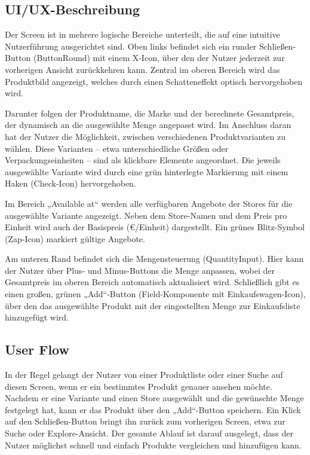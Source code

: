 \subsection{UI/UX-Beschreibung}
Der Screen ist in mehrere logische Bereiche unterteilt, die auf eine intuitive Nutzerführung ausgerichtet sind. Oben links befindet sich ein runder Schließen-Button (ButtonRound) mit einem X-Icon, über den der Nutzer jederzeit zur vorherigen Ansicht zurückkehren kann. Zentral im oberen Bereich wird das Produktbild angezeigt, welches durch einen Schatteneffekt optisch hervorgehoben wird.

Darunter folgen der Produktname, die Marke und der berechnete Gesamtpreis, der dynamisch an die ausgewählte Menge angepasst wird. Im Anschluss daran hat der Nutzer die Möglichkeit, zwischen verschiedenen Produktvarianten zu wählen. Diese Varianten – etwa unterschiedliche Größen oder Verpackungseinheiten – sind als klickbare Elemente angeordnet. Die jeweils ausgewählte Variante wird durch eine grün hinterlegte Markierung mit einem Haken (Check-Icon) hervorgehoben.

Im Bereich „Available at“ werden alle verfügbaren Angebote der Stores für die ausgewählte Variante angezeigt. Neben dem Store-Namen und dem Preis pro Einheit wird auch der Basispreis (€/Einheit) dargestellt. Ein grünes Blitz-Symbol (Zap-Icon) markiert gültige Angebote. 

Am unteren Rand befindet sich die Mengensteuerung (QuantityInput). Hier kann der Nutzer über Plus- und Minus-Buttons die Menge anpassen, wobei der Gesamtpreis im oberen Bereich automatisch aktualisiert wird. Schließlich gibt es einen großen, grünen „Add“-Button (Field-Komponente mit Einkaufswagen-Icon), über den das ausgewählte Produkt mit der eingestellten Menge zur Einkaufsliste hinzugefügt wird.

\subsection{User Flow}
In der Regel gelangt der Nutzer von einer Produktliste oder einer Suche auf diesen Screen, wenn er ein bestimmtes Produkt genauer ansehen möchte. Nachdem er eine Variante und einen Store ausgewählt und die gewünschte Menge festgelegt hat, kann er das Produkt über den „Add“-Button speichern. Ein Klick auf den Schließen-Button bringt ihn zurück zum vorherigen Screen, etwa zur Suche oder Explore-Ansicht. Der gesamte Ablauf ist darauf ausgelegt, dass der Nutzer möglichst schnell und einfach Produkte vergleichen und hinzufügen kann.


